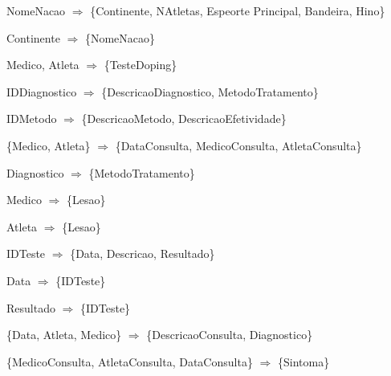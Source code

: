 \documentclass[12pt,a4paper]{article}
\begin{document}
NomeNacao $\Longrightarrow$ \{Continente, NAtletas, Espeorte Principal, Bandeira, Hino\} \par

Continente $\Longrightarrow$ \{NomeNacao\} \par

{Medico, Atleta} $\Longrightarrow$ \{TesteDoping\} \par

IDDiagnostico $\Longrightarrow$ \{DescricaoDiagnostico, MetodoTratamento\} \par

IDMetodo $\Longrightarrow$ \{DescricaoMetodo, DescricaoEfetividade\} \par

\{Medico, Atleta\} $\Longrightarrow$ \{DataConsulta, MedicoConsulta, AtletaConsulta\} \par

Diagnostico $\Longrightarrow$ \{MetodoTratamento\} \par
Medico $\Longrightarrow$ \{Lesao\} \par
Atleta $\Longrightarrow$ \{Lesao\} \par

IDTeste $\Longrightarrow$ \{Data, Descricao, Resultado\} \par
Data $\Longrightarrow$ \{IDTeste\} \par
Resultado $\Longrightarrow$ \{IDTeste\} \par

\{Data, Atleta, Medico\} $\Longrightarrow$ \{DescricaoConsulta, Diagnostico\} \par

\{MedicoConsulta, AtletaConsulta, DataConsulta\} $\Longrightarrow$ \{Sintoma\} \par
\end{document}
